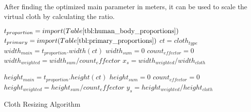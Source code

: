 After finding the optimized main parameter in meters, it can be used to scale the virtual cloth by calculating the ratio.

\begin{algorithm}
\dontprintsemicolon %

$t_{proportion}=import(Table \ref{tbl:human_body_proportions})$ \;
$t_{primary}=import(Table \ref{tbl:primary_proportions})$ \;
$ct=cloth_{type}$\;
$width_{main}=t_{proportion}.width(ct)$\;
$width_{sum}=0$\;
$count_{effector}=0$\;
$width_{weighted}=width_{sum}/count_effector$
$x_s=width_{weighted}/width_{cloth}$\;

$height_{main}=t_{proportion}.height(ct)$\;
$height_{sum}=0$\;
$count_{effector}=0$\;
$height_{weighted}=height_{sum}/count_effector$
$y_s=height_{weighted}/height_{cloth}$\;
\caption{Cloth Resizing Algorithm}
\label{algo:cloth_resize}
\end{algorithm}

